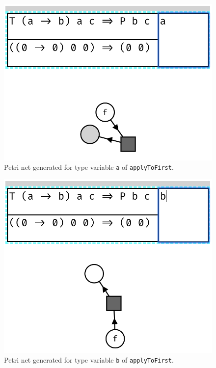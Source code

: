 \documentclass[11pt,openright,hidelinks,a4paper]{article}
\begin{document}
\begin{figure}[H]
\begin{center}
\includegraphics[scale=0.45]{applytofirsta}
\end{center}
\caption{Petri net generated for type variable \lstinline{a} of \lstinline{applyToFirst}.}
\label{fig:applyToFirstA}
\end{figure}

\begin{figure}[H]
\begin{center}
\includegraphics[scale=0.45]{applytofirstb}
\end{center}
\caption{Petri net generated for type variable \lstinline{b} of \lstinline{applyToFirst}.}
\label{fig:applyToFirstB}
\end{figure}
\end{document}
